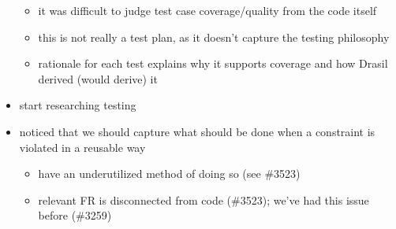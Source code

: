 \begin{itemize}
          \begin{itemize}
              \item it was difficult to judge test case coverage/quality from
                    the code itself
              \item this is not really a test plan, as it doesn't capture the
                    testing philosophy
              \item rationale for each test explains why it supports coverage
                    and how Drasil derived (would derive) it
          \end{itemize}
    \item start researching testing
    \item noticed that we should capture what should be done when a constraint
          is violated in a reusable way
          \begin{itemize}
              \item have an underutilized method of doing so (see \#3523)
              \item relevant FR is disconnected from code (\#3523); we've had
                    this issue before (\#3259)
          \end{itemize}
\end{itemize}
